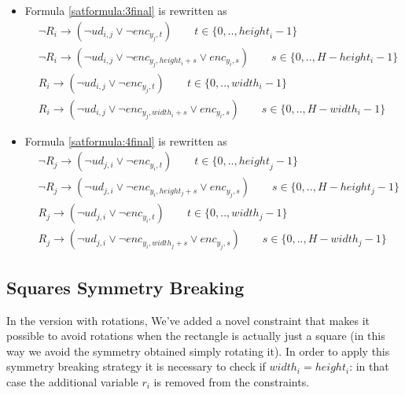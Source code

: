 \begin{itemize}
    \item Formula \ref{satformula:3final} is rewritten as
        \begin{equation*}
        \begin{aligned}
        &\neg R_i \rightarrow (\neg ud_{i,j} \vee \neg{enc}_{y_{j},t}) \qquad t \in \{ 0,.., {height}_i -1\}
        \\
        &\neg R_i \rightarrow (\neg ud_{i,j} \vee \neg {enc}_{y_{j},height_{i}+s} \vee enc_{y_{i},s}) \qquad s \in \{ 0,.., H-height_i-1\}
        \\
        &R_i \rightarrow (\neg ud_{i,j} \vee \neg{enc}_{y_{j},t}) \qquad t \in \{ 0,.., {width}_i -1\}
        \\
        &R_i \rightarrow (\neg ud_{i,j} \vee \neg {enc}_{y_{j},width_{i}+s} \vee enc_{y_{i},s}) \qquad s \in \{ 0,.., H-width_i-1\}
        \end{aligned}
        \end{equation*}

    \item Formula \ref{satformula:4final} is rewritten as
        \begin{equation*}
        \begin{aligned}
        &\neg R_j \rightarrow (\neg ud_{j,i} \vee \neg{enc}_{y_{i},t}) \qquad t \in \{ 0,.., {height}_j -1\}
        \\
        &\neg R_j \rightarrow (\neg ud_{j,i} \vee \neg {enc}_{y_{i},height_{j}+s} \vee enc_{y_{j},s}) \qquad s \in \{ 0,.., H-height_j-1\}
        \\
        &R_j \rightarrow (\neg ud_{j,i} \vee \neg{enc}_{y_{i},t}) \qquad t \in \{ 0,.., {width}_j -1\}
        \\
        &R_j \rightarrow (\neg ud_{j,i} \vee \neg {enc}_{y_{i},width_{j}+s} \vee enc_{y_{j},s}) \qquad s \in \{ 0,.., H-width_j-1\}
        \end{aligned}
        \end{equation*}
\end{itemize}
\subsection{Squares Symmetry Breaking}
In the version with rotations, We've added a novel constraint that makes it possible to avoid rotations when the rectangle is actually just a square (in this way we avoid the symmetry obtained simply rotating it). In order to apply this symmetry breaking strategy it is necessary to check if $width_i = height_i$: in that case the additional variable $r_i$ is removed from the constraints.
